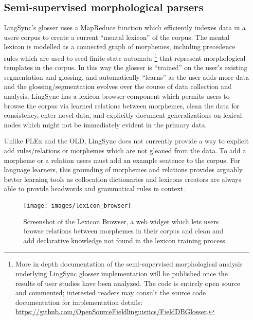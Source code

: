 \documentclass[11pt]{article}
\begin{document}
\subsection{Semi-supervised morphological parsers}
 \label{sec:lingsync-glosser} 

LingSync's glosser uses a MapReduce function which efficiently indexes data in
a users corpus to create a current ``mental lexicon'' of the corpus.  The
mental lexicon is modelled as a connected graph of morphemes, including
precedence rules which are used to seed finite-state automata \cite{Cook:2009}%
\footnote{More in depth documentation of the semi-supervised morphological
    analysis  underlying LingSync glosser implementation will be published once
    the results of user studies have been analyzed. The code is entirely open
    source and commented; interested readers may consult the source code
    documentation for implementation details: \\
\url{https://github.com/OpenSourceFieldlinguistics/FieldDBGlosser}.}
that represent morphological templates in the corpus. In this way the glosser
is ``trained'' on the user's existing segmentation and glossing, and
automatically ``learns'' as the user adds more data and the
glossing/segmentation evolves over the course of data collection and analysis. 
LingSync has a lexicon browser component which permits users to browse the
corpus via learned  relations between morphemes, clean the data for
consistency, enter novel data, and explicitly document generalizations on
lexical nodes which might not be immediately evident in the primary data.

Unlike FLEx \cite{Black:2006} and the OLD, LingSync does not currently provide
a way to explicit add rules/relations or morphemes which are not gleaned from
the data. To add a morpheme or a relation users must add an example sentence to
the corpus. For language learners, this grounding of morphemes and relations
provides arguably better learning tools as collocation dictionaries and
lexicons creators are always able to provide headwords and grammatical rules in
context.

\begin{figure}
\begin{center}
\texttt{[image: images/lexicon\_browser]}
\caption{Screenshot of the Lexicon Browser, a web widget which lets users
browse relations between morphemes in their corpus and clean and add
declarative knowledge not found in the lexicon training process.}
\label{lexicon_browser_screenshot}
\end{center}
\end{figure}
\end{document}
